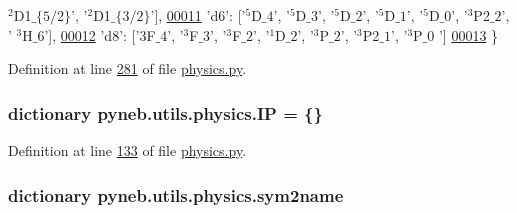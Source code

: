 \begin{DoxyCode}
{      $^2$D1$\_\{5/2\}$'}, \textcolor{stringliteral}{'$^2$D1$\_\{3/2\}$'}], 
\hypertarget{namespacepyneb_1_1utils_1_1physics_l00011}{}\hyperlink{classpyneb_1_1utils_1_1physics_1_1_c_s_t_a7c0a4476149f179955c86bfdb63ade78}{00011}             \textcolor{stringliteral}{'d6'}: [\textcolor{stringliteral}{'$^5$D$\_4$'}, \textcolor{stringliteral}{'$^5$D$\_3$'}, \textcolor{stringliteral}{'$^5$D$\_2$'}, \textcolor{stringliteral}{'$^5$D$\_1$'}, \textcolor{stringliteral}{'$^5$D$\_0$'}, \textcolor{stringliteral}{'$^3$P2$\_2$'}, \textcolor{stringliteral}{'
      $^3$H$\_6$'}], 
\hypertarget{namespacepyneb_1_1utils_1_1physics_l00012}{}\hyperlink{classpyneb_1_1utils_1_1physics_1_1_c_s_t_a468e4f9fac1fbd71b5ca458a84ae05cc}{00012}             \textcolor{stringliteral}{'d8'}: [\textcolor{stringliteral}{'$3$F$\_4$'}, \textcolor{stringliteral}{'$^3$F$\_3$'}, \textcolor{stringliteral}{'$^3$F$\_2$'}, \textcolor{stringliteral}{'$^1$D$\_2$'}, \textcolor{stringliteral}{'$^3$P$\_2$'}, \textcolor{stringliteral}{'$^3$P2$\_1$'}, \textcolor{stringliteral}{'$^3$P$\_0$
      '}]
\hypertarget{namespacepyneb_1_1utils_1_1physics_l00013}{}\hyperlink{classpyneb_1_1utils_1_1physics_1_1_c_s_t_a337f87b4676ea337149e177d81b481e1}{00013}             \}
\end{DoxyCode}


Definition at line \hyperlink{physics_8py_source_l00281}{281} of file \hyperlink{physics_8py_source}{physics.\-py}.

\hypertarget{namespacepyneb_1_1utils_1_1physics_a041738a1b0abdb597dd654aec4d96757}{
\subsubsection[{I\-P}]{\setlength{\rightskip}{0pt plus 5cm}dictionary pyneb.\-utils.\-physics.\-I\-P = \{\}}}\label{namespacepyneb_1_1utils_1_1physics_a041738a1b0abdb597dd654aec4d96757}


Definition at line \hyperlink{physics_8py_source_l00133}{133} of file \hyperlink{physics_8py_source}{physics.\-py}.

\hypertarget{namespacepyneb_1_1utils_1_1physics_aaad8df22981701858aa5539c86a96b5b}{
\subsubsection[{sym2name}]{\setlength{\rightskip}{0pt plus 5cm}dictionary pyneb.\-utils.\-physics.\-sym2name}}\label{namespacepyneb_1_1utils_1_1physics_aaad8df22981701858aa5539c86a96b5b}


